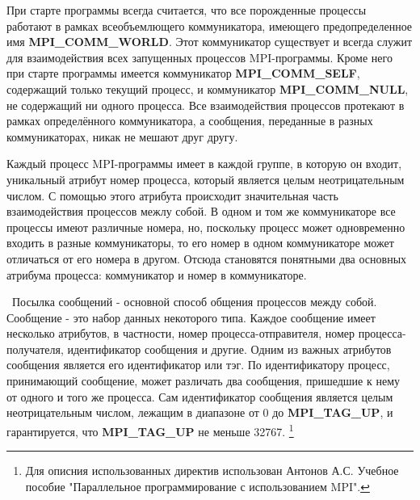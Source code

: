 \documentclass[14pt,a4paper,report]{ncc}
\begin{document}
При старте программы всегда считается, что все порожденные процессы работают в рамках всеобъемлющего коммуникатора, имеющего предопределенное имя \textbf{MPI\_COMM\_WORLD}. Этот коммуникатор существует и всегда служит для взаимодействия всех запущенных процессов MPI-программы. Кроме него при старте программы имеется коммуникатор \textbf{MPI\_COMM\_SELF}, содержащий только текущий процесс, и коммуникатор \textbf{MPI\_COMM\_NULL}, не содержащий ни одного процесса. Все взаимодействия процессов протекают в рамках определённого коммуникатора, а сообщения, переданные в разных коммуникаторах, никак не мешают друг другу.
\

Каждый процесс MPI-программы имеет в каждой группе, в которую он входит, уникальный атрибут номер процесса, который является целым неотрицательным числом. С помощью этого атрибута происходит значительная часть взаимодействия процессов межлу собой. В одном и том же коммуникаторе все процессы имеют различные номера, но, поскольку процесс может одновременно входить в разные коммуникаторы, то его номер в одном коммуникаторе может отличаться от его номера в другом. Отсюда становятся понятными два основных атрибума процесса: коммуникатор и номер в коммуникаторе.

\
Посылка сообщений - основной способ общения процессов между собой. Сообщение - это набор данных некоторого типа. Каждое сообщение имеет несколько атрибутов, в частности, номер процесса-отправителя, номер процесса-получателя, идентификатор сообщения и другие. Одним из важных атрибутов сообщения является его идентификатор или тэг. По идентификатору процесс, принимающий сообщение, может различать два сообщения, пришедшие к нему от одного и того же процесса. Сам идентификатор сообщения является целым неотрицательным числом, лежащим в диапазоне от 0 до \textbf{MPI\_TAG\_UP}, и гарантируется, что \textbf{MPI\_TAG\_UP} не меньше 32767.
\footnote{Для описния использованных директив использован Антонов А.С. Учебное пособие "Параллельное программирование с использованием MPI".}
\end{document}
